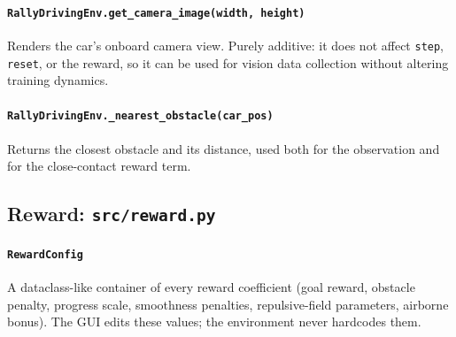 \documentclass[11pt]{article}
\begin{document}
\paragraph{\texttt{RallyDrivingEnv.get\_camera\_image(width, height)}}
Renders the car's onboard camera view. Purely additive: it does not affect
\texttt{step}, \texttt{reset}, or the reward, so it can be used for vision data
collection without altering training dynamics.

\paragraph{\texttt{RallyDrivingEnv.\_nearest\_obstacle(car\_pos)}}
Returns the closest obstacle and its distance, used both for the observation
and for the close-contact reward term.

\subsection{Reward: \texttt{src/reward.py}}\label{sec:reward}

\paragraph{\texttt{RewardConfig}}
A dataclass-like container of every reward coefficient (goal reward, obstacle
penalty, progress scale, smoothness penalties, repulsive-field parameters,
airborne bonus). The GUI edits these values; the environment never hardcodes
them.
\end{document}
